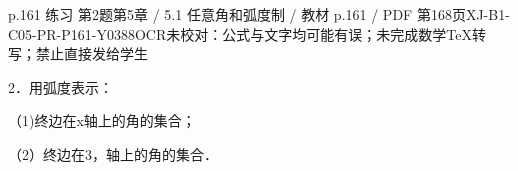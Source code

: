 \begin{bankitem}{p.161 练习 第2题}{第5章 / 5.1 任意角和弧度制 / 教材 p.161 / PDF 第168页}{XJ-B1-C05-PR-P161-Y0388}{OCR未校对：公式与文字均可能有误；未完成数学TeX转写；禁止直接发给学生}
\begin{ocrdraft}
\par
2．用弧度表示：
\par
（1)终边在x轴上的角的集合；
\par
（2）终边在3，轴上的角的集合．
\end{ocrdraft}
\end{bankitem}
